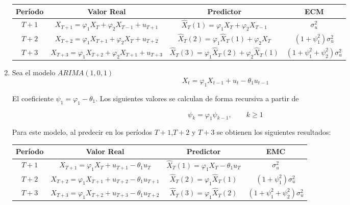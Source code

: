 \begin{ejemplo}
\begin{enumerate}
\begin{center}\small
\begin{tabular}{@{}cccc@{}}
\toprule
\textbf{Per\'{i}odo}& \textbf{Valor Real}& \textbf{Predictor}& \textbf{ECM} \\
\midrule
$T+1$& $X_{T+1} =\varphi_{1} X_{T} +\varphi_{2} X_{T-1} +u_{T+1} $& $\widehat{{X}}_{T} \left( 1 \right)=\varphi_{1} X_{T} +\varphi_{2} X_{T-1} $& $\sigma_{u}^{2}$ \\[5pt]
$T+2$& $X_{T+2} =\varphi_{1} X_{T+1} +\varphi_{2} X_{T} +u_{T+2} $& $\widehat{{X}}_{T} \left( 2 \right)=\varphi_{1} \widehat{{X}}_{T} \left( 1 \right)+\varphi_{2} X_{T} $& 
$\left( {1+\psi_{1}^{2} } \right)\sigma_{u}^{2} $ \\[5pt]
$T+3$& $X_{T+3} =\varphi_{1} X_{T+2} +\varphi_{2} X_{T+1} +u_{T+3} $& $\widehat{{X}}_{T} \left( 3 \right)=\varphi_{1} \widehat{{X}}_{T} \left( 2 \right)+\varphi_{2} \widehat{{X}}_{T} \left( 1 \right)$& $\left( {1+\psi_{1}^{2} +\psi_{2}^{2} } \right)\sigma_{u}^{2} $ \\
\bottomrule
\end{tabular}
\end{center}


\item Sea el modelo $ARIMA( {1,0,1})$
\[
X_{t} =\varphi_{1} X_{t-1} +u_{t} -\theta_{1} u_{t-1} 
\]

El coeficiente $\psi_{1} =\varphi_{1} -\theta_{1} .$ Los siguientes valores se calculan de forma recursiva a partir de

\[
\psi_{k} =\varphi_{1} \psi_{k-1} ,\quad \quad k\ge 1
\]

Para este modelo, al predecir en los per\'{i}odos $T+1$,$T+2$ y $T+3$ se obtienen los siguientes resultados:

\begin{center}\small
\begin{tabular}{@{}cccc@{}}
\toprule
\textbf{Per\'{i}odo}& \textbf{Valor Real}& \textbf{Predictor}& \textbf{EMC} \\
\midrule
$T+1$& $X_{T+1} =\varphi_{1} X_{T} +u_{T+1} -\theta_{1} u_{T} $& $\widehat{X}_{T} (1)=\varphi_{1} X_{T} -\theta_{1} u_{T} $& $\sigma_{u}^{2} $ \\[5pt]
$T+2$& $X_{T+2} =\varphi_{1} X_{T+1} +u_{T+2} -\theta_{1} u_{T+1} $& $\widehat{X}_{T} (2)=\varphi_{1} \widehat{X}_{T} (1)$& $\left( {1+\psi_{1}^{2} } \right)\sigma_{u}^{2} $ \\[5pt]
$T+3$& $X_{T+3} =\varphi_{1} X_{T+2} +u_{T+3} -\theta_{1} u_{T+2} $& $\widehat{X}_{T} (3)=\varphi_{1} \widehat{X}_{T} (2)$& $\left( {1+\psi_{1}^{2} +\psi_{2}^{2} } \right)\sigma_{u}^{2} $ \\
\bottomrule
\end{tabular}

\end{center}
\end{enumerate}
\end{ejemplo}


